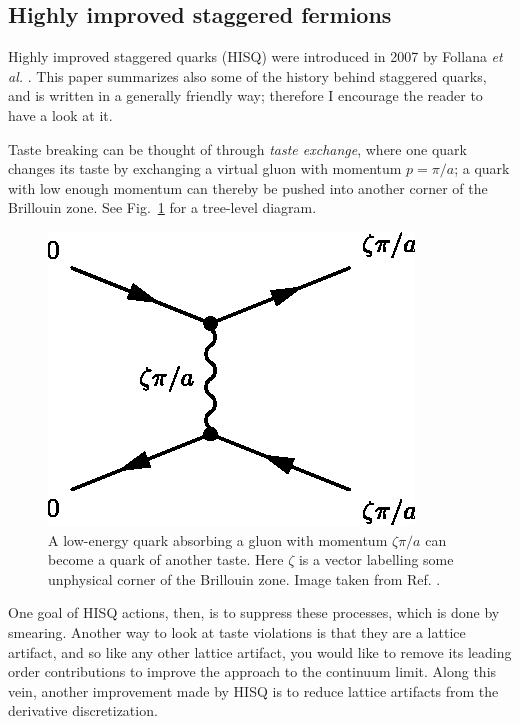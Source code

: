 \subsection{Highly improved staggered fermions}

Highly improved staggered quarks (HISQ) were introduced in 2007 by
Follana {\it et al.} \cite{follana_highly_2007}. This paper summarizes also
some of the history behind staggered quarks, and is written in a generally
friendly way; therefore I encourage the reader to have a look at it.

Taste breaking can be thought of through {\it taste exchange}, where
one quark changes its taste by exchanging a virtual gluon with momentum
$p=\pi/a$; a quark with low enough momentum can thereby be pushed into
another corner of the Brillouin zone. See Fig.~\ref{fig:treeLevelTasteExchange}
for a tree-level diagram.
\begin{figure}[t]
  \centering
  \includegraphics{figs/treelevel.eps}
  \caption{A low-energy quark absorbing a gluon with momentum $\zeta\pi/a$
           can become a quark of another taste. Here $\zeta$ is a vector
           labelling some unphysical corner of the Brillouin zone. Image
           taken from Ref. \cite{follana_highly_2007}.
           }
  \label{fig:treeLevelTasteExchange}
\end{figure}
One goal of HISQ actions, then, is to suppress these processes, which is
done by smearing. Another way to look at taste violations is that they
are a lattice artifact, and so like any other lattice artifact, you would
like to remove its leading order contributions to improve the
approach to the continuum limit. Along this vein, another improvement
made by HISQ is to reduce lattice artifacts from the derivative discretization.

